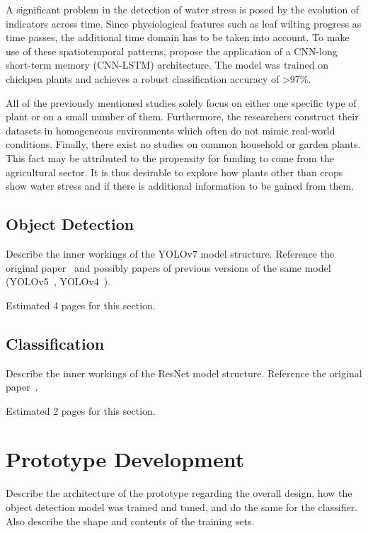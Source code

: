 \documentclass[draft,final]{vutinfth} %
\begin{document}
A significant problem in the detection of water stress is posed by the
evolution of indicators across time. Since physiological features such
as leaf wilting progress as time passes, the additional time domain
has to be taken into account. To make use of these spatiotemporal
patterns, \textcite{azimi2021} propose the application of a CNN-long
short-term memory (CNN-LSTM) architecture. The model was trained on
chickpea plants and achieves a robust classification accuracy of
>97\%.

All of the previously mentioned studies solely focus on either one
specific type of plant or on a small number of them. Furthermore, the
researchers construct their datasets in homogeneous environments which
often do not mimic real-world conditions. Finally, there exist no
studies on common household or garden plants. This fact may be
attributed to the propensity for funding to come from the agricultural
sector. It is thus desirable to explore how plants other than crops
show water stress and if there is additional information to be gained
from them.

\section{Object Detection}
\label{sec:background-detection}

Describe the inner workings of the YOLOv7 model structure. Reference
the original paper~\cite{wang2022} and possibly papers of previous
versions of the same model (YOLOv5~\cite{jocher2022},
YOLOv4~\cite{bochkovskiy2020}).

Estimated 4 pages for this section.

\section{Classification}
\label{sec:background-classification}

Describe the inner workings of the ResNet model structure. Reference
the original paper~\cite{he2016}.

Estimated 2 pages for this section.

\chapter{Prototype Development}
\label{chap:development}

Describe the architecture of the prototype regarding the overall
design, how the object detection model was trained and tuned, and do
the same for the classifier. Also describe the shape and contents of
the training sets.
\end{document}
